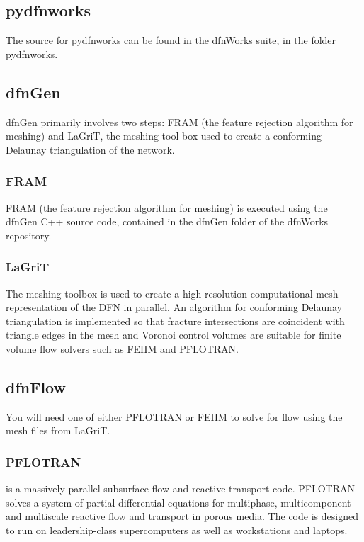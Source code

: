 \documentclass[letterpaper,10pt,english]{sphinxmanual}
\begin{document}
\subsection{pydfnworks}
\label{\detokenize{intro:pydfnworks}}
The source for pydfnworks can be found in the dfnWorks suite, in the folder
pydfnworks.


\subsection{dfnGen}
\label{\detokenize{intro:dfngen}}
dfnGen primarily involves two steps: FRAM (the feature rejection algorithm for meshing) and LaGriT, the meshing tool box used to create a conforming Delaunay triangulation of the network.


\subsubsection{FRAM}
\label{\detokenize{intro:fram}}
FRAM (the feature rejection algorithm for meshing) is executed using the
dfnGen C++ source code, contained in the dfnGen folder of the dfnWorks repository.


\subsubsection{LaGriT}
\label{\detokenize{intro:lagrit}}
The  meshing toolbox is used to create a high resolution computational
mesh representation of the DFN in parallel. An algorithm for conforming
Delaunay triangulation is implemented so that fracture intersections are
coincident with triangle edges in the mesh and Voronoi control volumes are
suitable for finite volume flow solvers such as FEHM and PFLOTRAN.


\subsection{dfnFlow}
\label{\detokenize{intro:dfnflow}}
You will need one of either PFLOTRAN or FEHM to solve for flow using the
mesh files from LaGriT.


\subsubsection{PFLOTRAN}
\label{\detokenize{intro:pflotran}}
  is a massively parallel subsurface flow and reactive transport
code. PFLOTRAN solves a system of partial differential equations for
multiphase, multicomponent and multiscale reactive flow and transport in
porous media. The code is designed to run on leadership-class supercomputers
as well as workstations and laptops.
\end{document}
